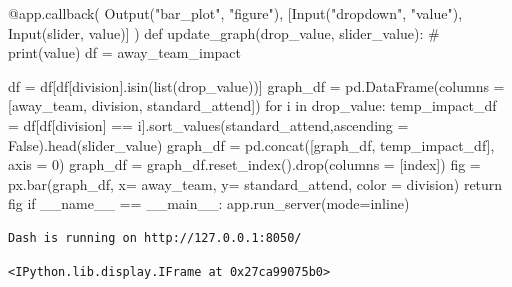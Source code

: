 \documentclass[
  letterpaper,
  DIV=11,
  numbers=noendperiod]{scrartcl}
\newenvironment{Shaded}{\begin{snugshade}}{\end{snugshade}}
\newcommand{\AttributeTok}[1]{\textcolor[rgb]{0.40,0.45,0.13}{#1}}
\newcommand{\BuiltInTok}[1]{\textcolor[rgb]{0.00,0.23,0.31}{#1}}
\newcommand{\CommentTok}[1]{\textcolor[rgb]{0.37,0.37,0.37}{#1}}
\newcommand{\ControlFlowTok}[1]{\textcolor[rgb]{0.00,0.23,0.31}{#1}}
\newcommand{\DecValTok}[1]{\textcolor[rgb]{0.68,0.00,0.00}{#1}}
\newcommand{\KeywordTok}[1]{\textcolor[rgb]{0.00,0.23,0.31}{#1}}
\newcommand{\NormalTok}[1]{\textcolor[rgb]{0.00,0.23,0.31}{#1}}
\newcommand{\OperatorTok}[1]{\textcolor[rgb]{0.37,0.37,0.37}{#1}}
\newcommand{\StringTok}[1]{\textcolor[rgb]{0.13,0.47,0.30}{#1}}
\newcommand{\VariableTok}[1]{\textcolor[rgb]{0.07,0.07,0.07}{#1}}
\begin{document}
\begin{Shaded}
\begin{Highlighting}[]
\AttributeTok{@app.callback}\NormalTok{(}
\NormalTok{    Output(}\StringTok{"bar\_plot"}\NormalTok{, }\StringTok{"figure"}\NormalTok{), }
\NormalTok{    [Input(}\StringTok{"dropdown"}\NormalTok{, }\StringTok{"value"}\NormalTok{),}
\NormalTok{     Input(}\StringTok{\textquotesingle{}slider\textquotesingle{}}\NormalTok{, }\StringTok{\textquotesingle{}value\textquotesingle{}}\NormalTok{)]}
\NormalTok{    )}
\KeywordTok{def}\NormalTok{ update\_graph(drop\_value, slider\_value):}
    \CommentTok{\# print(value)}
\NormalTok{    df }\OperatorTok{=}\NormalTok{ away\_team\_impact}

    

\NormalTok{    df }\OperatorTok{=}\NormalTok{ df[df[}\StringTok{\textquotesingle{}division\textquotesingle{}}\NormalTok{].isin(}\BuiltInTok{list}\NormalTok{(drop\_value))]}
\NormalTok{    graph\_df }\OperatorTok{=}\NormalTok{ pd.DataFrame(columns }\OperatorTok{=}\NormalTok{ [}\StringTok{\textquotesingle{}away\_team\textquotesingle{}}\NormalTok{, }\StringTok{\textquotesingle{}division\textquotesingle{}}\NormalTok{, }\StringTok{\textquotesingle{}standard\_attend\textquotesingle{}}\NormalTok{])}
    \ControlFlowTok{for}\NormalTok{ i }\KeywordTok{in}\NormalTok{ drop\_value:}
\NormalTok{        temp\_impact\_df }\OperatorTok{=}\NormalTok{ df[df[}\StringTok{\textquotesingle{}division\textquotesingle{}}\NormalTok{] }\OperatorTok{==}\NormalTok{ i].sort\_values(}\StringTok{\textquotesingle{}standard\_attend\textquotesingle{}}\NormalTok{,ascending }\OperatorTok{=} \VariableTok{False}\NormalTok{).head(slider\_value)}
\NormalTok{        graph\_df }\OperatorTok{=}\NormalTok{ pd.concat([graph\_df, temp\_impact\_df], axis }\OperatorTok{=} \DecValTok{0}\NormalTok{)}
\NormalTok{    graph\_df }\OperatorTok{=}\NormalTok{ graph\_df.reset\_index().drop(columns }\OperatorTok{=}\NormalTok{ [}\StringTok{\textquotesingle{}index\textquotesingle{}}\NormalTok{])}
\NormalTok{    fig }\OperatorTok{=}\NormalTok{ px.bar(graph\_df, x}\OperatorTok{=} \StringTok{\textquotesingle{}away\_team\textquotesingle{}}\NormalTok{, y}\OperatorTok{=} \StringTok{\textquotesingle{}standard\_attend\textquotesingle{}}\NormalTok{, color }\OperatorTok{=} \StringTok{\textquotesingle{}division\textquotesingle{}}\NormalTok{)}
    \ControlFlowTok{return}\NormalTok{ fig}
\ControlFlowTok{if} \VariableTok{\_\_name\_\_} \OperatorTok{==} \StringTok{\textquotesingle{}\_\_main\_\_\textquotesingle{}}\NormalTok{:}
\NormalTok{    app.run\_server(mode}\OperatorTok{=}\StringTok{\textquotesingle{}inline\textquotesingle{}}\NormalTok{)}
\end{Highlighting}
\end{Shaded}

\begin{verbatim}
Dash is running on http://127.0.0.1:8050/
\end{verbatim}

\begin{verbatim}
<IPython.lib.display.IFrame at 0x27ca99075b0>
\end{verbatim}
\end{document}
